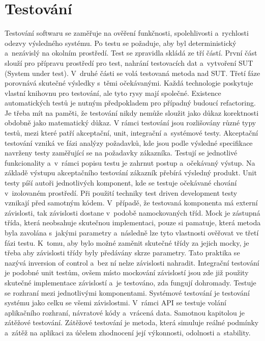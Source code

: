 \chapter{Testování}
Testování softwaru \cite{testing} se zaměřuje na ověření funkčnosti, spolehlivosti a~rychlosti odezvy výsledného systému. Po testu se požaduje, aby byl deterministický a~nezávislý na okolním prostředí. Test se zpravidla skládá ze tří částí. První část slouží pro přípravu prostředí pro test, nahrání testovacích dat a~vytvoření SUT (System under test). V~druhé části se volá testovaná metoda nad SUT. Třetí fáze porovnává skutečné výsledky s~těmi očekávanými. Každá technologie poskytuje vlastní knihovnu pro testování, ale tyto rysy mají společné. Existence automatických testů je nutným předpokladem pro případný budoucí refactoring. Je třeba mít na paměti, že testování nikdy nemůže sloužit jako důkaz korektnosti obdobně jako matematický důkaz. 
\newpara
V rámci testování jsou rozlišovány různé typy testů, mezi které patří akceptační, unit, integrační a~systémové testy.
\newpara
Akceptační testování vzniká ve fázi analýzy požadavků, kde jsou podle výsledné specifikace navrženy testy zaměřující se na požadavky zákazníka. Testují se jednotlivé funkcionality a~v~rámci popisu testu je zahrnut postup a~očekávaný výstup. Na základě výstupu akceptačního testování zákazník přebírá výsledný produkt.
\newpara
Unit testy píší autoři jednotlivých komponent, kde se testuje očekávané chování v~izolovaném prostředí. Při použití techniky test driven development testy vznikají před samotným kódem. V~případě, že testovaná komponenta má externí závislosti, tak závislosti dostane v~podobě namockovaných tříd. Mock je zástupná třída, která neobsahuje skutečnou implementaci, pouze si pamatuje, která metoda byla zavolána s~jakými parametry a~následně lze tyto vlastnosti ověřovat ve třetí fázi testu. K~tomu, aby bylo možné zaměnit skutečné třídy za jejich mocky, je třeba aby závislosti třídy byly předávány skrze parametry. Tato praktika se nazývá inversion of control a~bez ní nelze závislosti nahradit.
\newpara
Integrační testování je podobné unit testům, ovšem místo mockování závislostí jsou zde již použity skutečné implementace závislostí a~je testováno, zda fungují dohromady. Testuje se rozhraní mezi jednotlivými komponentami.
\newpara
Systémové testování je testování systému jako celku se všemi závislostmi. V~rámci API se testuje volání aplikačního rozhraní, návratové kódy a~vrácená data.
\newpara
Samotnou kapitolou je zátěžové testování. Zátěžové testování je metoda, která simuluje reálné podmínky a~zátěž na aplikaci za účelem zhodnocení její výkonnosti, odolnosti a~stability.


